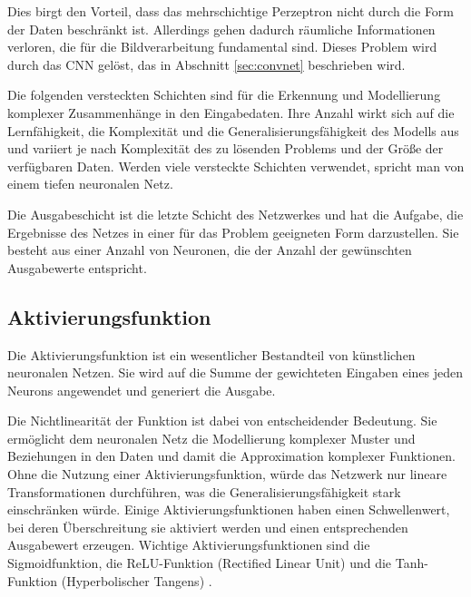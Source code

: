Dies birgt den Vorteil, dass das mehrschichtige Perzeptron nicht durch die Form der Daten beschränkt ist. Allerdings gehen dadurch räumliche Informationen verloren, die für die Bildverarbeitung fundamental sind. Dieses Problem wird durch das CNN gelöst, das in Abschnitt \ref{sec:convnet} beschrieben wird.

Die folgenden versteckten Schichten sind für die Erkennung und Modellierung komplexer Zusammenhänge in den Eingabedaten. Ihre Anzahl wirkt sich auf die Lernfähigkeit, die Komplexität und die Generalisierungsfähigkeit des Modells aus und variiert je nach Komplexität des zu lösenden Problems und der Größe der verfügbaren Daten. Werden viele versteckte Schichten verwendet, spricht man von einem tiefen neuronalen Netz.

Die Ausgabeschicht ist die letzte Schicht des Netzwerkes und hat die Aufgabe, die Ergebnisse des Netzes in einer für das Problem geeigneten Form darzustellen. Sie besteht aus einer Anzahl von Neuronen, die der Anzahl der gewünschten Ausgabewerte entspricht.

\subsection{Aktivierungsfunktion}
Die Aktivierungsfunktion ist ein wesentlicher Bestandteil von künstlichen neuronalen Netzen. Sie wird auf die Summe der gewichteten Eingaben eines jeden Neurons angewendet und generiert die Ausgabe.

Die Nichtlinearität der Funktion ist dabei von entscheidender Bedeutung. Sie ermöglicht dem neuronalen Netz die Modellierung komplexer Muster und Beziehungen in den Daten und damit die Approximation komplexer Funktionen. Ohne die Nutzung einer Aktivierungsfunktion, würde das Netzwerk nur lineare Transformationen durchführen, was die Generalisierungsfähigkeit stark einschränken würde. Einige Aktivierungsfunktionen haben einen Schwellenwert, bei deren Überschreitung sie aktiviert werden und einen entsprechenden Ausgabewert erzeugen. Wichtige Aktivierungsfunktionen sind die Sigmoidfunktion, die ReLU-Funktion (Rectified Linear Unit) und die Tanh-Funktion (Hyperbolischer Tangens) \cite{APICELLA202114}.

